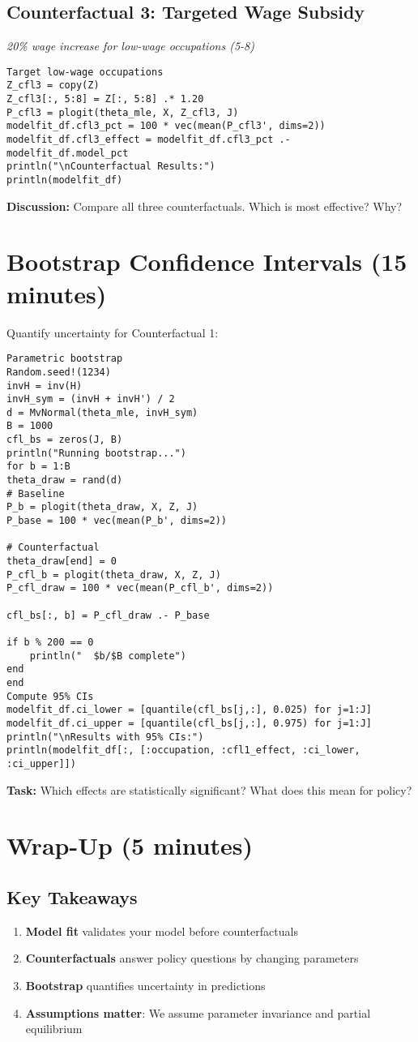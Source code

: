 \documentclass[12pt,english]{article}
\begin{document}
\subsection{Counterfactual 3: Targeted Wage Subsidy}
\textit{20\% wage increase for low-wage occupations (5-8)}
\begin{verbatim}
Target low-wage occupations
Z_cfl3 = copy(Z)
Z_cfl3[:, 5:8] = Z[:, 5:8] .* 1.20
P_cfl3 = plogit(theta_mle, X, Z_cfl3, J)
modelfit_df.cfl3_pct = 100 * vec(mean(P_cfl3', dims=2))
modelfit_df.cfl3_effect = modelfit_df.cfl3_pct .- modelfit_df.model_pct
println("\nCounterfactual Results:")
println(modelfit_df)
\end{verbatim}
\textbf{Discussion:} Compare all three counterfactuals. Which is most effective? Why?
\section{Bootstrap Confidence Intervals (15 minutes)}
Quantify uncertainty for Counterfactual 1:
\begin{verbatim}
Parametric bootstrap
Random.seed!(1234)
invH = inv(H)
invH_sym = (invH + invH') / 2
d = MvNormal(theta_mle, invH_sym)
B = 1000
cfl_bs = zeros(J, B)
println("Running bootstrap...")
for b = 1:B
theta_draw = rand(d)
# Baseline
P_b = plogit(theta_draw, X, Z, J)
P_base = 100 * vec(mean(P_b', dims=2))

# Counterfactual
theta_draw[end] = 0
P_cfl_b = plogit(theta_draw, X, Z, J)
P_cfl_draw = 100 * vec(mean(P_cfl_b', dims=2))

cfl_bs[:, b] = P_cfl_draw .- P_base

if b % 200 == 0
    println("  $b/$B complete")
end
end
Compute 95% CIs
modelfit_df.ci_lower = [quantile(cfl_bs[j,:], 0.025) for j=1:J]
modelfit_df.ci_upper = [quantile(cfl_bs[j,:], 0.975) for j=1:J]
println("\nResults with 95% CIs:")
println(modelfit_df[:, [:occupation, :cfl1_effect, :ci_lower, :ci_upper]])
\end{verbatim}
\textbf{Task:} Which effects are statistically significant? What does this mean for policy?
\section{Wrap-Up (5 minutes)}
\subsection{Key Takeaways}
\begin{enumerate}
\item \textbf{Model fit} validates your model before counterfactuals
\item \textbf{Counterfactuals} answer policy questions by changing parameters
\item \textbf{Bootstrap} quantifies uncertainty in predictions
\item \textbf{Assumptions matter}: We assume parameter invariance and partial equilibrium
\end{enumerate}
\end{document}
